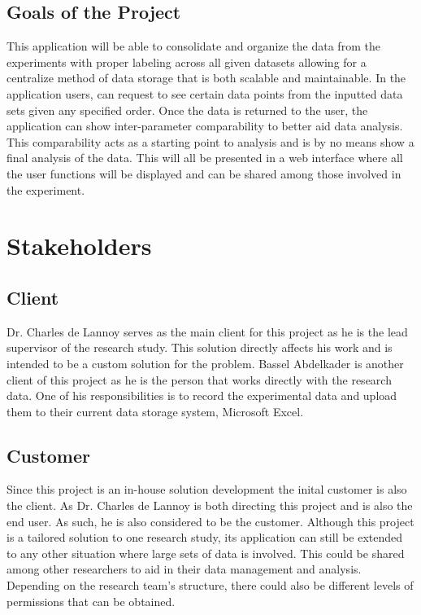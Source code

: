 \documentclass[12pt]{article}
\begin{document}
\subsection{Goals of the Project}
This application will be able to consolidate and organize the data from the
experiments with proper labeling across all given datasets allowing for a
centralize method of data storage that is both scalable and maintainable. In the
application users, can request to see certain data points from the inputted data
sets given any specified order. Once the data is returned to the user, the
application can show inter-parameter comparability to better aid data analysis.
This comparability acts as a starting point to analysis and is by no means show
a final analysis of the data. This will all be presented in a web interface
where all the user functions will be displayed and can be shared among those
involved in the experiment.   
\section{Stakeholders}

\subsection{Client}
Dr. Charles de Lannoy serves as the main client for this project as he is the
lead supervisor of the research study. This solution directly affects his work and
is intended to be a custom solution for the problem. Bassel Abdelkader is
another client of this project as he is the person that works directly with the
research data. One of his responsibilities is to record the experimental data and
upload them to their current data storage system, Microsoft Excel. 
\subsection{Customer}
Since this project is an in-house solution development the inital customer is
also the client. As Dr. Charles de Lannoy is both directing this project and is
also the end user. As such, he is also considered to be the customer.\newline 
Although this project is a tailored solution to one research study, its
application can still be extended to any other situation where large sets of
data is involved. This could be shared among other researchers to aid in their
data management and analysis. Depending on the research team's structure, there
could also be different levels of permissions that can be obtained.
\end{document}
